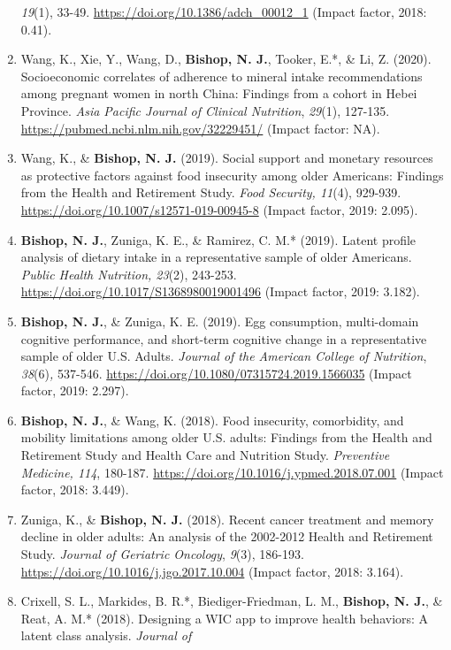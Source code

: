 \documentclass[
]{article}
\begin{document}
\begin{enumerate}
  \emph{19}(1), 33-49. \url{https://doi.org/10.1386/adch_00012_1}
  (Impact factor, 2018: 0.41).
\item
  Wang, K., Xie, Y., Wang, D., \textbf{Bishop, N. J.}, Tooker, E.*, \&
  Li, Z. (2020). Socioeconomic correlates of adherence to mineral intake
  recommendations among pregnant women in north China: Findings from a
  cohort in Hebei Province. \emph{Asia Pacific Journal of Clinical
  Nutrition}, \emph{29}(1), 127-135.
  \url{https://pubmed.ncbi.nlm.nih.gov/32229451/} (Impact factor: NA).
\item
  Wang, K., \& \textbf{Bishop, N. J.} (2019). Social support and
  monetary resources as protective factors against food insecurity among
  older Americans: Findings from the Health and Retirement Study.
  \emph{Food Security, 11}(4), 929-939.
  \url{https://doi.org/10.1007/s12571-019-00945-8} (Impact factor, 2019:
  2.095).
\item
  \textbf{Bishop, N. J.}, Zuniga, K. E., \& Ramirez, C. M.* (2019).
  Latent profile analysis of dietary intake in a representative sample
  of older Americans. \emph{Public Health Nutrition, 23}(2), 243-253.
  \url{https://doi.org/10.1017/S1368980019001496} (Impact factor, 2019:
  3.182).
\item
  \textbf{Bishop, N. J.}, \& Zuniga, K. E. (2019). Egg consumption,
  multi-domain cognitive performance, and short-term cognitive change in
  a representative sample of older U.S. Adults. \emph{Journal of the
  American College of Nutrition}, \emph{38}(6)\emph{,} 537-546.
  \url{https://doi.org/10.1080/07315724.2019.1566035} (Impact factor,
  2019: 2.297).
\item
  \textbf{Bishop, N. J.}, \& Wang, K. (2018). Food insecurity,
  comorbidity, and mobility limitations among older U.S. adults:
  Findings from the Health and Retirement Study and Health Care and
  Nutrition Study. \emph{Preventive Medicine, 114}, 180-187.
  \url{https://doi.org/10.1016/j.ypmed.2018.07.001} (Impact factor,
  2018: 3.449).
\item
  Zuniga, K., \& \textbf{Bishop, N. J.} (2018). Recent cancer treatment
  and memory decline in older adults: An analysis of the 2002-2012
  Health and Retirement Study. \emph{Journal of Geriatric Oncology},
  \emph{9}(3), 186-193. \url{https://doi.org/10.1016/j.jgo.2017.10.004}
  (Impact factor, 2018: 3.164).
\item
  Crixell, S. L., Markides, B. R.*, Biediger-Friedman, L. M.,
  \textbf{Bishop, N. J.}, \& Reat, A. M.* (2018). Designing a WIC app to
  improve health behaviors: A latent class analysis. \emph{Journal of
}
\end{enumerate}
\end{document}
